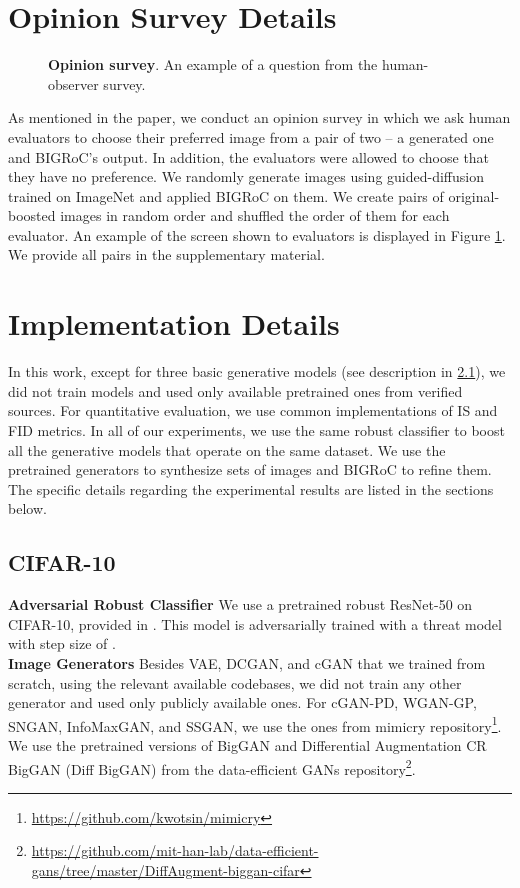 \documentclass[10pt]{article} \usepackage[accepted]{tmlr}
\begin{document}
\section{Opinion Survey Details}
\label{app:survey}
\begin{figure}[H]
    \centering
    \caption{\textbf{Opinion survey}. An example of a question from the human-observer survey.}
    \label{fig:survey_screenshot}
\end{figure}
As mentioned in the paper, we conduct an opinion survey in which we ask human evaluators to choose their preferred image from a pair of two -- a generated one and BIGRoC's output. In addition, the evaluators were allowed to choose that they have no preference.
We randomly generate  images using guided-diffusion~\citep{dhariwal2021diffusion} trained on ImageNet  and applied BIGRoC on them.
We create pairs of original-boosted images in random order and shuffled the order of them for each evaluator.  
An example of the screen shown to evaluators is displayed in Figure \ref{fig:survey_screenshot}.
We provide all  pairs in the supplementary material.


\section{Implementation Details}

In this work, except for three basic generative models (see description in \ref{sec:imp_det_cifar}), we did not train models and used only available pretrained ones from verified sources. For quantitative evaluation, we use common implementations of IS and FID metrics. In all of our experiments, we use the same robust classifier to boost all the generative models that operate on the same dataset. 
We use the pretrained generators to synthesize sets of images and BIGRoC to refine them.
The specific details regarding the experimental results are listed in the sections below.

\subsection{CIFAR-10}
\label{sec:imp_det_cifar}
\noindent \textbf{Adversarial Robust Classifier}
We use a pretrained robust ResNet-50 on CIFAR-10, provided in \citep{robustness}. This model is adversarially trained with a threat model  with step size  of .
\\
\noindent \textbf{Image Generators} Besides VAE, DCGAN, and cGAN that we trained from scratch, using the relevant available codebases, we did not train any other generator and used only publicly available ones. For cGAN-PD, WGAN-GP, SNGAN, InfoMaxGAN, and SSGAN, we use the ones from mimicry repository\footnote{\url{https://github.com/kwotsin/mimicry}}. We use the pretrained versions of BigGAN and Differential Augmentation CR BigGAN (Diff BigGAN) from the data-efficient GANs repository\footnote{\url{https://github.com/mit-han-lab/data-efficient-gans/tree/master/DiffAugment-biggan-cifar}}.
\end{document}
